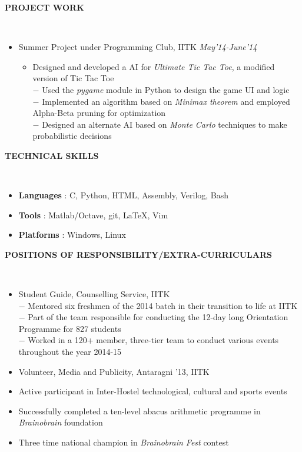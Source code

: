 \documentclass[a4paper,10pt]{article}
\newcommand{\isep}{-2 pt}
\newcommand{\lsep}{-0.5cm}
\newcommand{\resheading}[1]{{\small \colorbox{mygrey}{\begin{minipage}{0.975\textwidth}{\textbf{#1 \vphantom{p\^{E}}}}\end{minipage}}}}
\begin{document}
\resheading{\textbf{PROJECT WORK} }\\[\lsep]
\begin{itemize}
\item\noindent Summer Project under Programming Club, IITK \hfill\emph{May'14-June'14}
\vspace{-2mm}
\begin{itemize}\itemsep \isep
\item \noindent Designed and developed a AI for \emph{Ultimate Tic Tac Toe}, a modified version of Tic Tac Toe\\
$-$ Used the \emph{pygame} module in Python to design the game UI and logic\\
$-$ Implemented an algorithm based on \emph{Minimax theorem} and employed Alpha-Beta pruning for optimization\\
$-$ Designed an alternate AI based on \emph{Monte Carlo} techniques to make probabilistic decisions\\
\end{itemize}
\end{itemize}

\resheading{\textbf{TECHNICAL SKILLS} }\\[\lsep]
\begin{itemize}\itemsep\isep
\item \noindent \textbf{Languages} : C, Python, HTML, Assembly, Verilog, Bash
\item \noindent \textbf{Tools} : Matlab/Octave, git, \LaTeX, Vim
\item \noindent \textbf{Platforms} : Windows, Linux
\end{itemize}

\resheading{\textbf{POSITIONS OF RESPONSIBILITY/EXTRA-CURRICULARS} }\\[\lsep]
\begin{itemize}\itemsep \isep
\item \noindent Student Guide, Counselling Service, IITK\\
$-$ Mentored six freshmen of the 2014 batch in their transition to life at IITK\\
$-$ Part of the team responsible for conducting the 12-day long Orientation Programme for 827 students\\
$-$ Worked in a 120+ member, three-tier team to conduct various events throughout the year 2014-15
\item \noindent Volunteer, Media and Publicity, Antaragni '13, IITK
\item \noindent Active participant in Inter-Hostel technological, cultural and sports events
\item \noindent Successfully completed a ten-level abacus arithmetic programme in \emph{Brainobrain} foundation
\item \noindent Three time national champion in \emph{Brainobrain Fest} contest
\end{itemize}
\end{document}
